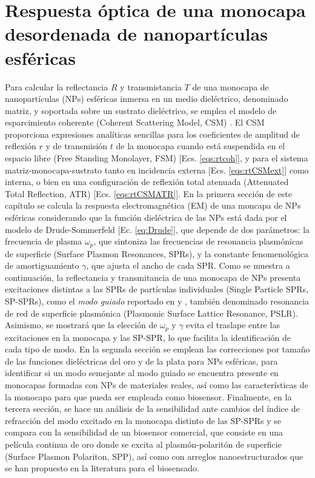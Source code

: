 
\chapter{Respuesta óptica de una monocapa desordenada de nanopartículas esféricas}
\label{chapter:Resultados}


Para calcular la reflectancia $R$ y transmistancia $T$  de una monocapa de nanopartículas (NPs) esféricas inmersa en un medio dieléctrico, denominado matriz, y soportada sobre un sustrato dieléctrico, se emplea el modelo de esparcimiento coherente (Coherent Scattering Model, CSM) \cite{reyes2018analytical,garcia2012multiple}. El CSM proporciona expresiones analíticas sencillas para los coeficientes de amplitud de reflexión $r$ y de transmisión $t$ de la monocapa cuando está suspendida en el espacio libre (Free Standing Monolayer, FSM) [Ecs. \eqref{eqs:rtcoh}], y para el sistema matriz-monocapa-sustrato tanto en incidencia externa [Ecs. \eqref{eqs:rtCSMext}] como interna, o bien en una configuración de reflexión total atenuada  (Attenuated Total Reflection, ATR) [Ecs. \eqref{eqs:rtCSMATR}]. En la primera sección de este capítulo se calcula la respuesta electromagnética (EM) de una moncapa de NPs esféricas considerando que la función dieléctrica de las NPs está dada por el modelo de Drude-Sommerfeld [Ec. \eqref{eq:Drude}], que depende de dos parámetros: la frecuencia de plasma $\omega_p$, que sintoniza las frecuencias de resonancia plasmónicas de superficie (Surface Plasmon Resonances, SPRs), y la constante fenomenológica de amortiguamiento $\gamma$, que ajusta el ancho de cada SPR. Como se muestra a continuación, la reflectancia y transmitancia de una monocapa de NPs presenta excitaciones distintas a las  SPRs de partículas individuales (Single Particle SPRs, SP-SPRs), como el \emph{modo guiado} reportado en \cite{kabashin2009plasmonic} y \cite{danilov2018ultra}, también denominado resonancia de red de superficie plasmónica (Plasmonic Surface Lattice Resonance, PSLR). Asimismo, se mostrará que la elección de $\omega_p$ y $\gamma$ evita el traslape entre las excitaciones en la monocapa y las SP-SPR, lo que facilita la identificación de cada tipo de modo. En la segunda sección se emplean las correcciones por tamaño de las funciones dieléctricas del oro y de la plata para NPs esféricas, para identificar si un modo semejante al modo guiado se encuentra presente en monocapas formadas con NPs de materiales reales, así como las  características de la monocapa para que pueda ser empleada como biosensor. Finalmente, en la tercera sección, se hace un análisis de la sensibilidad ante cambios del índice de refracción del modo excitado en la monocapa distinto de las SP-SPRs  y se compara con la sensibilidad de un biosensor comercial, que consiste en una película continua de oro donde se excita al plasmón-polaritón de superficie (Surface Plasmon Polariton, SPP), así como con arreglos nanoestructurados que se han propuesto en la literatura para el biosensado.


